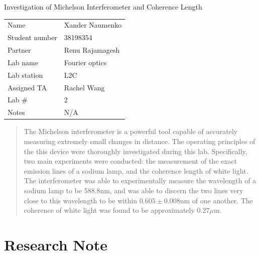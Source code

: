 \documentclass[letterpaper, reqno,11pt]{article}
\begin{document}
\begin{titlepage}
\centering


\Large Investigation of Michelson Interferometer and Coherence Length

\normalsize




\begin{tabular}{ll}
Name & Xander Naumenko \\[2ex]
Student number & 38198354 \\[2ex]
Partner & Renu Rajamagesh \\[2ex]
Lab name & Fourier optics \\[2ex]
Lab station  & L2C \\[2ex]
Assigned TA            & Rachel Wang \\[2ex]
Lab \#            & 2 \\[2ex]
Notes &  N/A
\end{tabular}


\begin{abstract}
    The Michelson interferometer is a powerful tool capable of accurately measuring extremely small changes in distance. The operating principles of the this device were thoroughly investigated during this lab. Specifically, two main experiments were conducted: the measurement of the exact emission lines of a sodium lamp, and the coherence length of white light. The interferometer was able to experimentally measure the wavelength of a sodium lamp to be 588.8nm, and was able to discern the two lines very close to this wavelength to be within $0.605\pm 0.008$nm of one another. The coherence of white light was found to be approximately $0.27\mu$m.
\end{abstract}

\end{titlepage}

\newpage

\section{Research Note}
\end{document}
